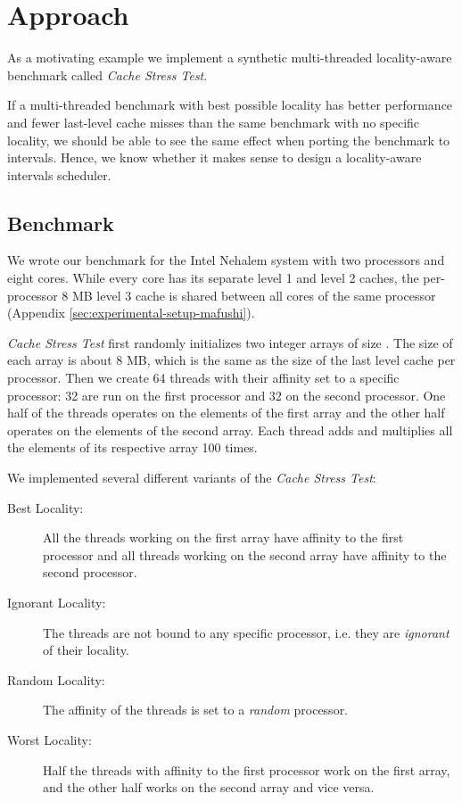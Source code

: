 
\chapter{Approach}
\label{chap:locality-approach}

As a motivating example we implement a synthetic multi-threaded
locality-aware benchmark called \emph{Cache Stress Test}. 

If a multi-threaded benchmark with best possible locality has better
performance and fewer last-level cache misses than the same benchmark
with no specific locality, we should be able to see the same effect
when porting the benchmark to intervals. Hence, we know whether it
makes sense to design a locality-aware intervals scheduler.

\section{Benchmark}

We wrote our benchmark for the Intel Nehalem system with two
processors and eight cores. While every core has its separate level 1
and level 2 caches, the per-processor 8 MB level 3 cache is shared
between all cores of the same processor (Appendix
\ref{sec:experimental-setup-mafushi}).

\emph{Cache Stress Test} first randomly initializes two integer arrays
of size . The size of each array is about 8 MB,
which is the same as the size of the last level cache per
processor. Then we create 64 threads with their affinity set to a
specific processor: 32 are run on the first processor and 32 on the
second processor. One half of the threads operates on the elements of
the first array and the other half operates on the elements of the
second array. Each thread adds and multiplies all the elements of its
respective array 100 times.

We implemented several different variants of the \emph{Cache Stress
  Test}:

\begin{description}
\item[Best Locality:] All the threads working on the first array
  have affinity to the first processor and all threads working on the
  second array have affinity to the second processor.
\item[Ignorant Locality:] The threads are not bound to any
  specific processor, i.e. they are \emph{ignorant} of their locality.
\item[Random Locality:] The affinity of the threads is set to a
  \emph{random} processor.
\item[Worst Locality:] Half the threads with affinity to the first
  processor work on the first array, and the other half works on the
  second array and vice versa.
\end{description}


